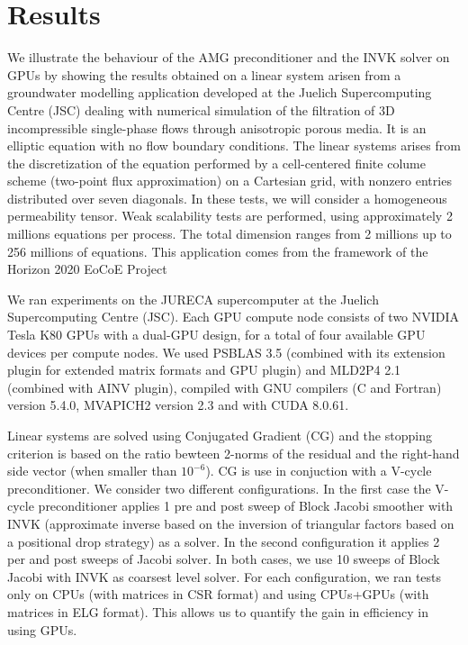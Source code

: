 \section{Results}

We illustrate the behaviour of the AMG preconditioner and the INVK
solver on GPUs  by showing the results obtained on a linear system
arisen from a groundwater modelling application developed at the
Juelich Supercomputing Centre (JSC)  dealing with numerical simulation
of the filtration of 3D incompressible single-phase flows through
anisotropic porous media. It is an elliptic equation with no flow
boundary conditions. The linear systems arises from the discretization
of the equation performed by a cell-centered finite colume scheme
(two-point flux approximation) on a Cartesian grid, with nonzero
entries distributed over seven diagonals. In these tests, we will
consider a homogeneous permeability tensor.  
Weak scalability tests are performed, using approximately 2 millions
equations per process. The total dimension ranges from 2 millions up
to 256 millions of equations. 
This application comes from the framework of the Horizon 2020 EoCoE
Project 

We ran experiments on the JURECA supercomputer at the Juelich
Supercomputing Centre (JSC).  Each GPU compute node consists of two
NVIDIA Tesla K80 GPUs with a dual-GPU design, for a total of four
available GPU devices per compute nodes.  
We used PSBLAS 3.5 (combined with its extension plugin for extended
matrix formats and GPU plugin) and MLD2P4 2.1 (combined with AINV
plugin),  compiled with  GNU compilers (C and Fortran) version 5.4.0,
MVAPICH2 version 2.3 and with CUDA 8.0.61. 

Linear systems are solved using Conjugated Gradient (CG) and the
stopping criterion is based on the ratio bewteen 2-norms of the
residual and the right-hand side vector (when smaller than
$10^{-6}$). CG is use in conjuction with a V-cycle preconditioner. We
consider two different configurations. In the first case the V-cycle
preconditioner applies 1 pre and post sweep of Block Jacobi smoother
with INVK (approximate inverse based on the inversion of triangular
factors based on a positional drop strategy) as a solver. In the
second configuration it applies 2 per and post sweeps of Jacobi
solver. In both cases, we use 10 sweeps of Block Jacobi with INVK  as
coarsest level solver.   
For each configuration, we ran tests only on CPUs (with matrices in
CSR format) and using CPUs+GPUs (with matrices in ELG format). This
allows us to quantify the gain in efficiency in using GPUs.   

